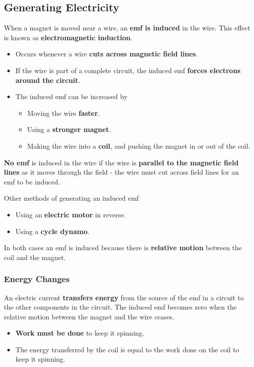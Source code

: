 \subsection{Generating Electricity}

When a magnet is moved near a wire, an \textbf{emf is induced} in the wire. This effect is known as \textbf{electromagnetic induction}.
\begin{itemize}
    \item Occurs whenever a wire \textbf{cuts across magnetic field lines}.
    \item If the wire is part of a complete circuit, the induced emf \textbf{forces electrons around the circuit}.
    \item The induced emf can be increased by
        \begin{itemize}
            \item Moving the wire \textbf{faster}.
            \item Using a \textbf{stronger magnet}.
            \item Making the wire into a \textbf{coil}, and pushing the magnet in or out of the coil.
        \end{itemize}
\end{itemize}

\textbf{No emf} is induced in the wire if the wire is \textbf{parallel to the magnetic field lines} as it moves through the field - the wire must cut across field lines for an emf to be induced.

Other methods of generating an induced emf
\begin{itemize}
    \item Using an \textbf{electric motor} in reverse.
    \item Using a \textbf{cycle dynamo}.
\end{itemize}
In both cases an emf is induced because there is \textbf{relative motion} between the coil and the magnet.

\subsubsection*{Energy Changes}

An electric current \textbf{transfers energy} from the source of the emf in a circuit to the other components in the circuit. The induced emf becomes zero when the relative motion between the magnet and the wire ceases.
\begin{itemize}
    \item \textbf{Work must be done} to keep it spinning.
    \item The energy transferred by the coil is equal to the work done on the coil to keep it spinning.
\end{itemize}

